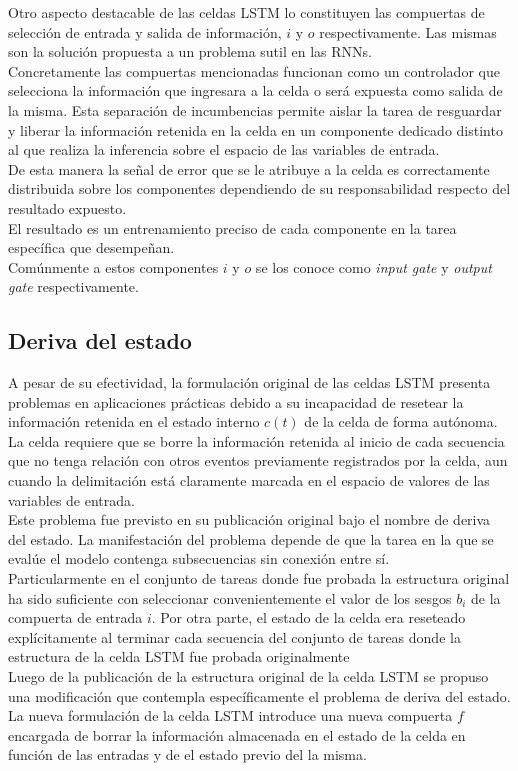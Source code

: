 \documentclass{article}
\begin{document}
	Otro aspecto destacable de las celdas LSTM lo constituyen las compuertas de selección de entrada y salida de información, $i$ y $o$ respectivamente. Las mismas son la solución propuesta a un problema sutil en las RNNs.\\
	Concretamente las compuertas mencionadas funcionan como un controlador que selecciona la información que ingresara a la celda o será expuesta como salida de la misma. Esta separación de incumbencias permite aislar la tarea de resguardar y liberar la información retenida en la celda en un componente dedicado distinto al que realiza la inferencia sobre el espacio de las variables de entrada.\\
	De esta manera la señal de error que se le atribuye a la celda es correctamente distribuida sobre los componentes dependiendo de su responsabilidad respecto del resultado expuesto.\\
	El resultado es un entrenamiento preciso de cada componente en la tarea específica que desempeñan.\\
	Comúnmente a estos componentes $i$ y $o$ se los conoce como \textit{input gate} y \textit{output gate} respectivamente.
	
	\subsection{Deriva del estado}
	A pesar de su efectividad, la formulación original de las celdas LSTM presenta problemas en aplicaciones prácticas debido a su incapacidad de resetear la información retenida en el estado interno $c(t)$ de la celda de forma autónoma. \\
	La celda requiere que se borre la información retenida al inicio de cada secuencia que no tenga relación con otros eventos previamente registrados por la celda, aun cuando la delimitación está claramente marcada en el espacio de valores de las variables de entrada.\\
	Este problema fue previsto en su publicación original bajo el nombre de deriva del estado. La manifestación del problema depende de que la tarea en la que se evalúe el modelo contenga subsecuencias sin conexión entre sí. \\
	Particularmente en el conjunto de tareas donde fue probada la estructura original ha sido suficiente con seleccionar convenientemente el valor de los sesgos $b_i$ de la compuerta de entrada $i$. Por otra parte, el estado de la celda era reseteado explícitamente al terminar cada secuencia del conjunto de tareas donde la estructura de la celda LSTM fue probada originalmente\\
	Luego de la publicación de la estructura original de la celda LSTM se propuso una modificación que contempla específicamente el problema de deriva del estado\cite{16ForgateGatePeepholeConnectionsGers}. La nueva formulación de la celda LSTM introduce una nueva compuerta $f$ encargada de borrar la información almacenada en el estado de la celda en función de las entradas y de el estado previo del la misma.\\
	
\end{document}
